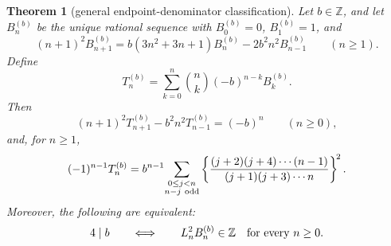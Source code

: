 \documentclass[11pt]{article}
\newtheorem{theorem}{Theorem}[section]
\theoremstyle{definition}
\theoremstyle{remark}
\begin{document}
\begin{theorem}[general endpoint-denominator classification]
\label{thm:generalendpoint}
Let $b\in\mathbb Z$, and let $B^{(b)}_n$ be the unique rational sequence with
$B^{(b)}_0=0$, $B^{(b)}_1=1$, and
\begin{equation}\label{eq:brec}
 (n+1)^2B^{(b)}_{n+1}
 =b(3n^2+3n+1)B^{(b)}_n-2b^2n^2B^{(b)}_{n-1}
 \qquad(n\ge1).
\end{equation}
Define
\begin{equation}\label{eq:btransform}
 T^{(b)}_n=\sum_{k=0}^n\binom nk(-b)^{n-k}B^{(b)}_k.
\end{equation}
Then
\begin{equation}\label{eq:bTrec}
 (n+1)^2T^{(b)}_{n+1}-b^2n^2T^{(b)}_{n-1}=(-b)^n
 \qquad(n\ge0),
\end{equation}
and, for $n\ge1$,
\begin{equation}\label{eq:bTsquares}
 (-1)^{n-1}T^{(b)}_n
 =b^{n-1}\!
 \sum_{\substack{0\le j<n\\n-j\ {\rm odd}}}
 \left\{
 \frac{(j+2)(j+4)\cdots(n-1)}
      {(j+1)(j+3)\cdots n}
 \right\}^{\!2}.
\end{equation}
Moreover, the following are equivalent:
\begin{equation}\label{eq:bclassification}
 4\mid b
 \qquad\Longleftrightarrow\qquad
 L_n^2B^{(b)}_n\in\mathbb Z\quad\hbox{for every }n\ge0.
\end{equation}
\end{theorem}
\end{document}
